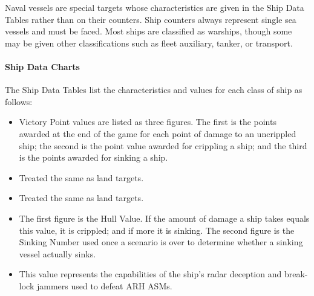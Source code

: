 Naval vessels are special targets whose characteristics are given in the Ship Data Tables rather than on their counters.  Ship counters always represent single sea vessels and must be faced.  Most ships are classified as warships, though some may be given other classifications such as fleet auxiliary, tanker, or transport.

\paragraph{Ship Data Charts}
The Ship Data Tables list the characteristics and values for each class of ship as follows: 

\begin{itemize}

    

    \item {} Victory Point values are listed as three figures.  The first is the points awarded at the end of the game for each point of damage to an uncrippled ship; the second is the point value awarded for crippling a ship; and the third is the points awarded for sinking a ship.

    \item {} Treated the same as land targets.

    \item {} Treated the same as land targets.
    
    \item {} The first figure is the Hull Value.  If the amount of damage a ship takes equals this value, it is crippled; and if more it is sinking. The second figure is the Sinking Number used once a scenario is over to determine whether a sinking vessel actually sinks.

    \item {} This value represents the capabilities of the ship's radar deception and break-lock jammers used to defeat ARH ASMs.


\end{itemize}
